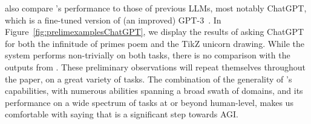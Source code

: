 also compare \DV's performance to those of previous LLMs, most notably ChatGPT, which is a fine-tuned version of (an improved) GPT-3~\cite{gpt3}. In Figure~\ref{fig:prelimexamplesChatGPT}, we display the results of asking ChatGPT for both the infinitude of primes poem and the TikZ unicorn drawing. While the system performs non-trivially on both tasks, there is no comparison with the outputs from \DV. These preliminary observations will repeat themselves throughout the paper, on a great variety of tasks. The combination of the generality of \DV's capabilities, with numerous abilities spanning a broad swath of domains, and its performance on a wide spectrum of tasks at or beyond human-level, makes us comfortable %
with saying that {\DV} is a significant step towards AGI.
\newline

